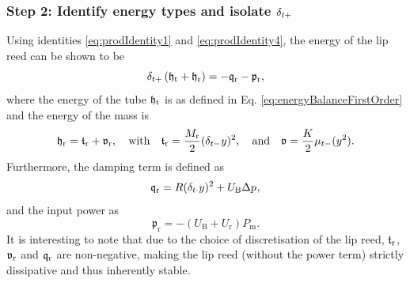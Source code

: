 \subsubsection{Step 2: Identify energy types and isolate $\delta_{t+}$}
Using identities \eqref{eq:prodIdentity1} and \eqref{eq:prodIdentity4}, the energy of the lip reed can be shown to be
\begin{equation}
    \delta_{t+}\left(\mathfrak{h}_\text{t}+\mathfrak{h}_\text{r}\right) = - \mathfrak{q}_\text{r} - \mathfrak{p}_\text{r},
\end{equation}
where the energy of the tube $\mathfrak{h}_{\text{t}}$ is as defined in Eq. \eqref{eq:energyBalanceFirstOrder} and the energy of the mass is
\begin{equation}
    \mathfrak{h}_{\text{r}} = \mathfrak{t}_{\text{r}} + \mathfrak{v}_{\text{r}}, \quad \text{with} \quad \mathfrak{t}_{\text{r}} = \frac{M_\text{r}}{2}(\delta_{t-}y)^2, \quad \text{and} \quad \mathfrak{v} = \frac{K}{2}\mu_{t-}(y^2).
\end{equation}
Furthermore, the damping term is defined as
\begin{equation}
    \mathfrak{q}_\text{r} = R(\delta_{t\cdot} y)^2 + U_\text{B}\Delta p^{},
\end{equation}
and the input power as
\begin{equation}
    \mathfrak{p}_\text{r} = -(U_\text{B} + U_\text{r})P_\text{m}.
\end{equation}
It is interesting to note that due to the choice of discretisation of the lip reed, $\mathfrak{t}_{\text{r}}$, $\mathfrak{v}_{\text{r}}$ and $\mathfrak{q}_{\text{r}}$ are non-negative, making the lip reed (without the power term) strictly dissipative and thus inherently stable. 

